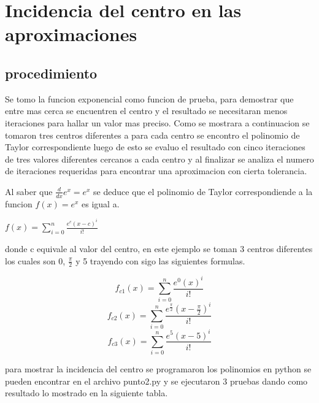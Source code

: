 \documentclass[12pt]{article}
\begin{document}
    
    \section{Incidencia del centro en las aproximaciones}
        \subsection{procedimiento}
        Se tomo la funcion exponencial como funcion de prueba, para demostrar que entre mas 
        cerca se encuentren el centro y el resultado se necesitaran menos iteraciones para 
        hallar un valor mas preciso.
        Como se mostrara a continuacion se tomaron tres centros diferentes a para cada centro
        se encontro el polinomio de Taylor correspondiente luego de esto se evaluo el resultado
        con cinco iteraciones de tres valores diferentes cercanos a cada centro y al finalizar se
        analiza el numero de iteraciones requeridas para encontrar una aproximacion con cierta
        tolerancia.

        Al saber que $\frac{d}{dx} e^{x} = e^{x}$ se deduce que el polinomio de Taylor 
        correspondiende a la funcion $f(x) = e^{x}$ es igual a.
        \begin{center}
        \begin{math}
            f(x) = \sum_{i=0}^{n} \frac{e^{c}(x-c)^{i}}{i!}
        \end{math}
        \end{center}
        donde c equivale al valor del centro, en este ejemplo se toman 3 centros diferentes los
        cuales son 0, $\frac{\pi}{2}$ y 5 trayendo con sigo las siguientes formulas.
        
        \begin{equation}
            f_{c1}(x) = \sum_{i=0}^{n} \frac{e^{0}(x)^{i}}{i!}
        \end{equation}
        \begin{equation}
            f_{c2}(x) = \sum_{i=0}^{n} \frac{e^{\frac{\pi}{2}}(x-\frac{\pi}{2})^{i}}{i!}
        \end{equation}
        \begin{equation}
            f_{c3}(x) = \sum_{i=0}^{n} \frac{e^{5}(x-5)^{i}}{i!}
        \end{equation}

        para mostrar la incidencia del centro se programaron los polinomios en python se pueden
        encontrar en el archivo punto2.py y se ejecutaron 3 pruebas dando como resultado lo 
        mostrado en la siguiente tabla.
        
\end{document}
